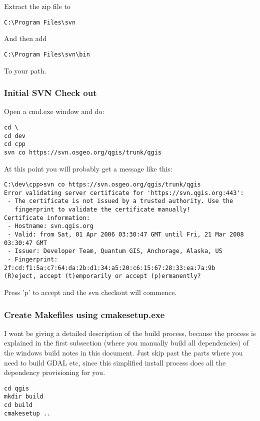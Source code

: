 Extract the zip file to

\begin{verbatim}
C:\Program Files\svn
\end{verbatim}

And then add

\begin{verbatim}
C:\Program Files\svn\bin
\end{verbatim}

To your path.

\hypertarget{toc106}{}
\subsubsection{Initial SVN Check out}
Open a cmd.exe window and do:

\begin{verbatim}
cd \
cd dev
cd cpp
svn co https://svn.osgeo.org/qgis/trunk/qgis 
\end{verbatim}

At this point you will probably get a message like this:

\begin{verbatim}
C:\dev\cpp>svn co https://svn.osgeo.org/qgis/trunk/qgis
Error validating server certificate for 'https://svn.qgis.org:443':
 - The certificate is not issued by a trusted authority. Use the
   fingerprint to validate the certificate manually!
Certificate information:
 - Hostname: svn.qgis.org
 - Valid: from Sat, 01 Apr 2006 03:30:47 GMT until Fri, 21 Mar 2008 03:30:47 GMT
 - Issuer: Developer Team, Quantum GIS, Anchorage, Alaska, US
 - Fingerprint: 2f:cd:f1:5a:c7:64:da:2b:d1:34:a5:20:c6:15:67:28:33:ea:7a:9b
(R)eject, accept (t)emporarily or accept (p)ermanently?
\end{verbatim}

Press 'p' to accept and the svn checkout will commence.

\hypertarget{toc107}{}
\subsubsection{Create Makefiles using cmakesetup.exe}
I wont be giving a detailed description of the build process, because 
the process is explained in the first subsection (where you manually build 
all dependencies) of the windows build notes in this document. Just skip 
past the parts where you need to build GDAL etc, since this simplified 
install process does all the dependency provisioning for you.

\begin{verbatim}
cd qgis
mkdir build
cd build
cmakesetup ..
\end{verbatim}

